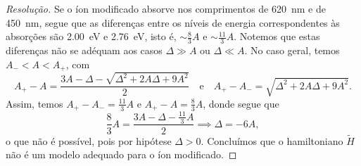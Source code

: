 \begin{proof}[Resolução]
    Se o íon modificado absorve nos comprimentos de \SI{620}{nm} e de \SI{450}{nm}, segue que as diferenças entre os níveis de energia correspondentes às absorções são \SI{2.00}{eV} e \SI{2.76}{eV}, isto é, \(\sim \frac{8}{3}A\) e \(\sim \frac{11}{3}A\). Notemos que estas diferenças
    não se adéquam aos casos \(\Delta \gg A\) ou \(\Delta \ll A\). No caso geral, temos \(A_- < A < A_+\), com
    \begin{equation*}
        A_+ - A = \frac{3A - \Delta - \sqrt{\Delta^2 + 2A \Delta + 9A^2}}{2} \quad\text{e}\quad
        A_+ - A_- = \sqrt{\Delta^2 + 2A \Delta + 9A^2}.
    \end{equation*}
    Assim, temos \(A_+ - A_- = \frac{11}{3}A\) e \(A_+ - A = \frac83A\), donde segue que
    \begin{equation*}
        \frac{8}{3}A = \frac{3A - \Delta - \frac{11}{3}A}{2} \implies \Delta = - 6A,
    \end{equation*}
    o que não é possível, pois por hipótese \(\Delta > 0\). Concluímos que o hamiltoniano \(\tilde{H}\) não é um modelo adequado para o íon modificado.
\end{proof}
